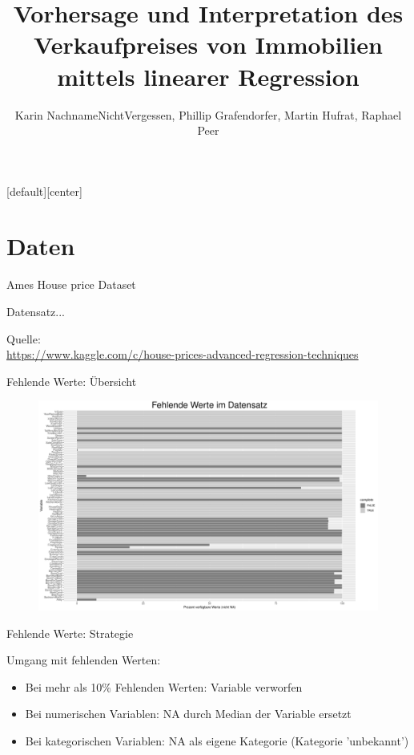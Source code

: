 \documentclass[10pt]{beamer}
\title{Vorhersage und Interpretation des\\Verkaufpreises von Immobilien\\mittels linearer Regression}
\date{}
\author{Karin NachnameNichtVergessen, Phillip Grafendorfer, Martin Hufrat, Raphael Peer}
\begin{document}
[default][center]

\maketitle

\section{Daten}


\begin{frame}{Ames House price Dataset}
	
	Datensatz...
	
	\begin{tiny}		
		Quelle:\\
		\url{https://www.kaggle.com/c/house-prices-advanced-regression-techniques}
	\end{tiny}
\end{frame}


\begin{frame}{Fehlende Werte: Übersicht}
	
	\begin{figure}
		\includegraphics[width=\textwidth, keepaspectratio]{figures/na_stats}
	\end{figure}
	
\end{frame}

\begin{frame}{Fehlende Werte: Strategie}
	
	\begin{Large}{Umgang mit fehlenden Werten:}\end{Large}
	\begin{itemize}
		\item Bei mehr als 10\% Fehlenden Werten: Variable verworfen
		\item Bei numerischen Variablen: NA durch Median der Variable ersetzt
		\item Bei kategorischen Variablen: NA als eigene Kategorie (Kategorie 'unbekannt')
	\end{itemize}
	
\end{frame}
\end{document}
